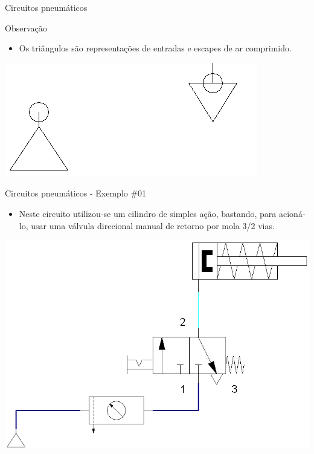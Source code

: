 \begin{frame}{Circuitos pneumáticos}
	\begin{block}{Observação}
		\begin{itemize}
			\item Os triângulos são representações de entradas e escapes de ar comprimido.
		\end{itemize}
	\end{block}
	
	\medskip
	
	\centering
	\includegraphics[width=0.8\linewidth]{Figuras/Ch14/fig41}
	
\end{frame}


\begin{frame}{Circuitos pneumáticos - Exemplo \#01}
	\begin{block}{}
		\begin{itemize}
			\item Neste circuito utilizou-se um cilindro de simples ação, bastando, para acioná-lo, usar uma válvula direcional manual de retorno por mola 3/2 vias.
		\end{itemize}
	\end{block}
	
	\medskip
	
	\centering
	\includegraphics[width=0.65\linewidth]{Figuras/Ch14/fig40}
	
\end{frame}


